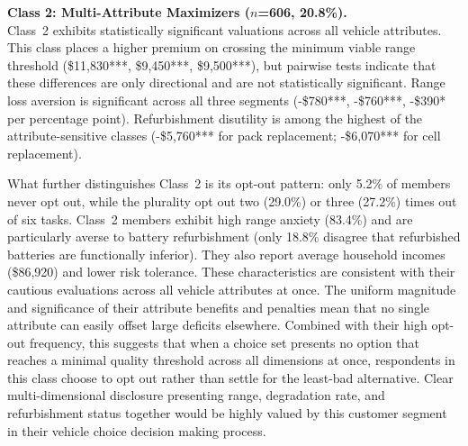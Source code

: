 \documentclass[a4paper,fleqn]{cas-sc}   %
\begin{document}
\medskip

\noindent\textbf{Class 2: Multi-Attribute Maximizers ($n$=606, 20.8\%).}\\
Class~2 exhibits statistically significant valuations across all vehicle attributes. This class places a higher premium on crossing the minimum viable range threshold (\$11,830***, \$9,450***, \$9,500***), but pairwise tests indicate that these differences are only directional and are not statistically significant. Range loss aversion is significant across all three segments (-\$780***, -\$760***, -\$390* per percentage point). Refurbishment disutility is among the highest of the attribute-sensitive classes (-\$5,760*** for pack replacement; -\$6,070*** for cell replacement).

What further distinguishes Class~2 is its opt-out pattern: only 5.2\% of members never opt out, while the plurality opt out two (29.0\%) or three (27.2\%) times out of six tasks. Class~2 members exhibit high range anxiety (83.4\%) and are particularly averse to battery refurbishment (only 18.8\% disagree that refurbished batteries are functionally inferior). They also report average household incomes (\$86,920) and lower risk tolerance. These characteristics are consistent with their cautious evaluations across all vehicle attributes at once. The uniform magnitude and significance of their attribute benefits and penalties mean that no single attribute can easily offset large deficits elsewhere. Combined with their high opt-out frequency, this suggests that when a choice set presents no option that reaches a minimal quality threshold across all dimensions at once, respondents in this class choose to opt out rather than settle for the least-bad alternative. Clear multi-dimensional disclosure presenting range, degradation rate, and refurbishment status together would be highly valued by this customer segment in their vehicle choice decision making process.

\medskip
\end{document}
